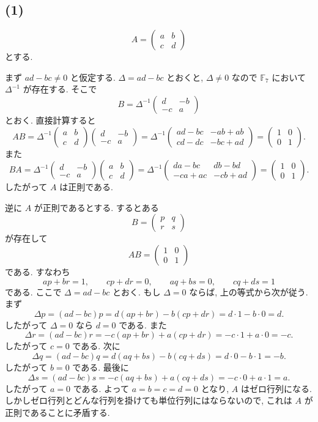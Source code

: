 \documentclass[uplatex,dvipdfmx,a4paper,14pt]{jsarticle}
\newcommand{\F}{\mathbb{F}}
\begin{document}
\subsection*{(1)}
\[
A=\begin{pmatrix}a&b\\c&d\end{pmatrix}
\]
とする.

まず $ad-bc\ne0$ と仮定する. $\Delta=ad-bc$ とおくと, $\Delta\ne0$ なので $\F_7$ において $\Delta^{-1}$ が存在する. そこで
\[
B=\Delta^{-1}\begin{pmatrix}d&-b\\-c&a\end{pmatrix}
\]
とおく. 直接計算すると
\[
AB=
\Delta^{-1}
\begin{pmatrix}a&b\\c&d\end{pmatrix}
\begin{pmatrix}d&-b\\-c&a\end{pmatrix}
=
\Delta^{-1}
\begin{pmatrix}
ad-bc&-ab+ab\\
cd-dc&-bc+ad
\end{pmatrix}
=
\begin{pmatrix}1&0\\0&1\end{pmatrix}.
\]
また
\[
BA=
\Delta^{-1}
\begin{pmatrix}d&-b\\-c&a\end{pmatrix}
\begin{pmatrix}a&b\\c&d\end{pmatrix}
=
\Delta^{-1}
\begin{pmatrix}
da-bc&db-bd\\
-ca+ac&-cb+ad
\end{pmatrix}
=
\begin{pmatrix}1&0\\0&1\end{pmatrix}.
\]
したがって $A$ は正則である.

逆に $A$ が正則であるとする. するとある
\[
B=\begin{pmatrix}p&q\\r&s\end{pmatrix}
\]
が存在して
\[
AB=\begin{pmatrix}1&0\\0&1\end{pmatrix}
\]
である. すなわち
\[
ap+br=1,
\qquad
cp+dr=0,
\qquad
aq+bs=0,
\qquad
cq+ds=1
\]
である.
ここで $\Delta=ad-bc$ とおく. もし $\Delta=0$ ならば, 上の等式から次が従う.
まず
\[
\Delta p=(ad-bc)p=d(ap+br)-b(cp+dr)=d\cdot1-b\cdot0=d.
\]
したがって $\Delta=0$ なら $d=0$ である. また
\[
\Delta r=(ad-bc)r=-c(ap+br)+a(cp+dr)=-c\cdot1+a\cdot0=-c.
\]
したがって $c=0$ である. 次に
\[
\Delta q=(ad-bc)q=d(aq+bs)-b(cq+ds)=d\cdot0-b\cdot1=-b.
\]
したがって $b=0$ である. 最後に
\[
\Delta s=(ad-bc)s=-c(aq+bs)+a(cq+ds)=-c\cdot0+a\cdot1=a.
\]
したがって $a=0$ である. よって $a=b=c=d=0$ となり, $A$ はゼロ行列になる. しかしゼロ行列とどんな行列を掛けても単位行列にはならないので, これは $A$ が正則であることに矛盾する.
\end{document}
